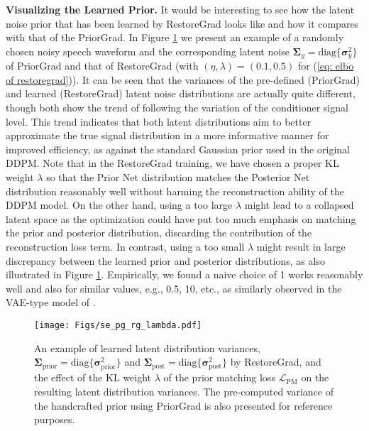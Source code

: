 \noindent\textbf{Visualizing the Learned Prior.} It would be interesting to see how the latent noise prior that has been learned by RestoreGrad looks like and how it compares with that of the PriorGrad. In Figure \ref{fig: learned noise prior} we present an example of a randomly chosen noisy speech waveform and the corresponding latent noise $\boldsymbol{\Sigma}_{y}=\mbox{diag}\{\boldsymbol{\sigma}^2_{y}\}$ of PriorGrad and that of RestoreGrad (with $(\eta, \lambda)=(0.1, 0.5)$ for (\ref{eq: elbo of restoregrad})). It can be seen that the variances of the pre-defined (PriorGrad) and learned (RestoreGrad) latent noise distributions are actually quite different, though both show the trend of following the variation of the conditioner signal level. This trend indicates that both latent distributions aim to better approximate the true signal distribution in a more informative manner for improved efficiency, as against the standard Gaussian prior used in the original DDPM. Note that in the RestoreGrad training, we have chosen a proper KL weight $\lambda$ so that the Prior Net distribution matches the Posterior Net distribution reasonably well without harming the reconstruction ability of the DDPM model. On the other hand, using a too large $\lambda$ might lead to a collapsed latent space as the optimization could have put too much emphasis on matching the prior and posterior distribution, discarding the contribution of the reconstruction loss term. In contrast, using a too small $\lambda$ might result in large discrepancy between the learned prior and posterior distributions, as also illustrated in Figure \ref{fig: learned noise prior}. 
Empirically, we found a naive choice of 1 works reasonably well and also for similar values, e.g., 0.5, 10, etc., as similarly observed in the VAE-type model of \citet{kohl2018probabilistic}.


\begin{figure}[!t]
    \centering
    \texttt{[image: Figs/se\_pg\_rg\_lambda.pdf]}
    \caption{An example of learned latent distribution variances, $\boldsymbol{\Sigma}_{\text{prior}}=\mbox{diag}\{\boldsymbol{\sigma}^2_{\text{prior}}\}$ and $\boldsymbol{\Sigma}_{\text{post}}=\mbox{diag}\{\boldsymbol{\sigma}^2_{\text{post}}\}$ by RestoreGrad, and the effect of the KL weight $\lambda$ of the prior matching loss $\mathcal{L}_{\text{PM}}$ on the resulting latent distribution variances. The pre-computed variance of the handcrafted prior using PriorGrad is also presented for reference purposes.} 
\label{fig: learned noise prior}
\end{figure}


